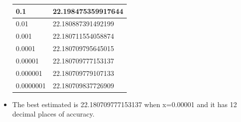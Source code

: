 \documentclass[12pt,en,a4paper]{article}
\begin{document}
\begin{itemize}
		\begin{table}[h]
			\centering
			\begin{tabular}{|l|l|}
				\hline
				0.1 & 22.198475359917644 \\ \hline
				0.01 & 22.180887391492199 \\ \hline
				0.001 & 22.180711554058874 \\ \hline
				0.0001 & 22.180709795645015 \\ \hline
				0.00001 & 22.180709777153137 \\ \hline
				0.000001 & 22.180709779107133 \\ \hline
				0.0000001 & 22.180709837726909 \\ \hline
			\end{tabular}
		\end{table}
		\item The best estimated is 22.180709777153137 when x=0.00001 and it has 12 decimal places of accuracy.
	\end{itemize}
	\newpage
\end{document}
